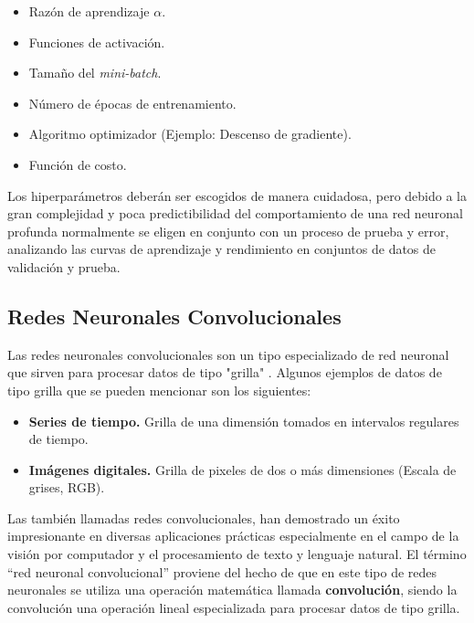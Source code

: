             \begin{itemize}
                \item Razón de aprendizaje $\alpha$.
                \item Funciones de activación.
                \item Tamaño del \textit{mini-batch}.
                \item Número de épocas de entrenamiento.
                \item Algoritmo optimizador (Ejemplo: Descenso de gradiente).
                \item Función de costo.
            \end{itemize}

            Los hiperparámetros deberán ser escogidos de manera cuidadosa, pero debido a la gran complejidad y poca predictibilidad
            del comportamiento de una red neuronal profunda normalmente se eligen en conjunto con un proceso de prueba y error, 
            analizando las curvas de aprendizaje y rendimiento en conjuntos de datos de validación y prueba.

    \subsection{Redes Neuronales Convolucionales}
    Las redes neuronales convolucionales son un tipo especializado de red neuronal que 
    sirven para procesar datos de tipo "grilla" \cite{Goodfellow-et-al-2016}. Algunos ejemplos 
    de datos de tipo grilla que se pueden mencionar son los siguientes:
    \begin{itemize}
        \item \textbf{Series de tiempo.} Grilla de una dimensión tomados en intervalos regulares de tiempo.
        \item \textbf{Imágenes digitales.} Grilla de pixeles de dos o más dimensiones (Escala de grises, RGB).
    \end{itemize}

    Las también llamadas redes convolucionales, han demostrado un éxito impresionante en diversas 
    aplicaciones prácticas especialmente en el campo de la visión por computador y el procesamiento de texto y lenguaje natural. 
    El término ``red neuronal convolucional'' proviene del hecho de que en este tipo 
    de redes neuronales se utiliza una operación matemática llamada \textbf{convolución}, siendo la convolución 
    una operación lineal especializada para procesar datos de tipo grilla.

